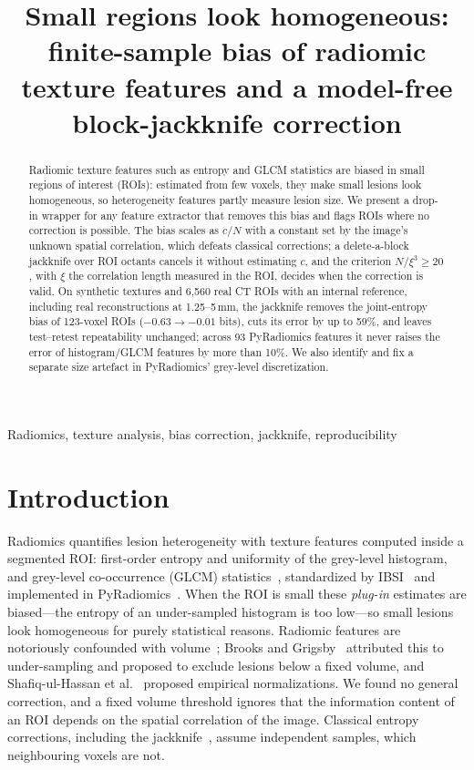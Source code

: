 \documentclass{article}
\title{Small regions look homogeneous: finite-sample bias of radiomic texture features and a model-free block-jackknife correction}
\begin{document}
\maketitle

\begin{abstract}
Radiomic texture features such as entropy and GLCM statistics are biased in small regions of interest (ROIs): estimated from few voxels, they make small lesions look homogeneous, so heterogeneity features partly measure lesion size. We present a drop-in wrapper for any feature extractor that removes this bias and flags ROIs where no correction is possible. The bias scales as $c/N$ with a constant set by the image's unknown spatial correlation, which defeats classical corrections; a delete-a-block jackknife over ROI octants cancels it without estimating $c$, and the criterion $N/\xi^3\ge20$, with $\xi$ the correlation length measured in the ROI, decides when the correction is valid. On synthetic textures and 6{,}560 real CT ROIs with an internal reference, including real reconstructions at 1.25--5\,mm, the jackknife removes the joint-entropy bias of 123-voxel ROIs ($-0.63\to-0.01$ bits), cuts its error by up to 59\%, and leaves test--retest repeatability unchanged; across 93 PyRadiomics features it never raises the error of histogram/GLCM features by more than 10\%. We also identify and fix a separate size artefact in PyRadiomics' grey-level discretization.
\end{abstract}

\begin{keywords}
Radiomics, texture analysis, bias correction, jackknife, reproducibility
\end{keywords}

\section{Introduction}
\label{sec:intro}
Radiomics quantifies lesion heterogeneity with texture features computed inside a segmented ROI: first-order entropy and uniformity of the grey-level histogram, and grey-level co-occurrence (GLCM) statistics~\cite{haralick1973}, standardized by IBSI~\cite{zwanenburg2020} and implemented in PyRadiomics~\cite{vangriethuysen2017}. When the ROI is small these \emph{plug-in} estimates are biased---the entropy of an under-sampled histogram is too low---so small lesions look homogeneous for purely statistical reasons. Radiomic features are notoriously confounded with volume~\cite{welch2019}; Brooks and Grigsby~\cite{brooks2014} attributed this to under-sampling and proposed to exclude lesions below a fixed volume, and Shafiq-ul-Hassan et al.~\cite{shafiq2017} proposed empirical normalizations. We found no general correction, and a fixed volume threshold ignores that the information content of an ROI depends on the spatial correlation of the image. Classical entropy corrections, including the jackknife~\cite{miller1955,zahl1977,paninski2003}, assume independent samples, which neighbouring voxels are not.
\end{document}
